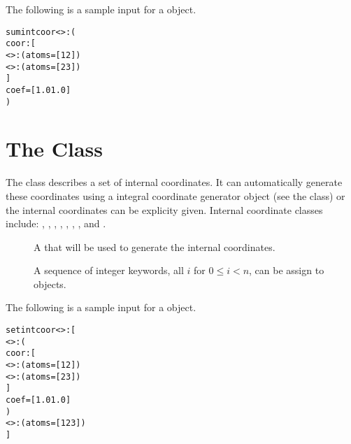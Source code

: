 The following is a sample  input for
a  object.
\begin{alltt}
  sumintcoor<>: (
    coor: [
      <>:( atoms = [ 1 2 ] )
      <>:( atoms = [ 2 3 ] )
      ]
    coef = [ 1.0 1.0 ]
    )
\end{alltt}


\section{The  Class}\label{SetIntCoor}

The  class describes a set of internal coordinates.  It
can automatically generate these coordinates using a integral coordinate
generator object (see the  class) or the internal
coordinates can be explicity given.  Internal coordinate classes include:
, , ,
, ,
, , and
.

\begin{description}
  \item[] A 
     that will be used to generate the internal
    coordinates.

  \item[] A sequence of integer keywords, all $i$ for $0 \leq i <
    n$, can be assign to  objects.

\end{description}

The following is a sample  input for
a  object.
\begin{alltt}
  setintcoor<>: [
    <>: (
      coor: [
        <>:( atoms = [ 1 2 ] )
        <>:( atoms = [ 2 3 ] )
        ]
      coef = [ 1.0 1.0 ]
      )
    <>:( atoms = [ 1 2 3 ] )
  ]
\end{alltt}


